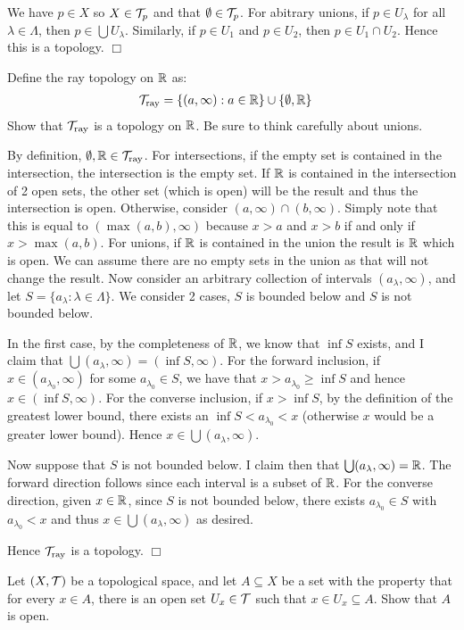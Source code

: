 \documentclass{article}
\begin{document}
\begin{spacedenumerate}
    We have $p\in X$ so $X\in \mathcal{T}_{p}$ and that $\emptyset \in \mathcal{T}_{p}$. For abitrary unions, if $p\in U_{\lambda}$ for all $\lambda \in \Lambda$, then $p\in \bigcup U_{\lambda}$. Similarly, if $p\in U_{1}$ and $p\in U_{2}$, then $p\in U_{1}\cap U_{2}$. Hence this is a topology. $\Box$
    \item Define the ray topology on $\mathbb{R}$ as:
    \begin{align*}
        \mathcal{T}_{\text{ray}} &= \{(a,\infty): a\in \mathbb{R}\}\cup \{\emptyset, \mathbb{R}\}
    \end{align*}
    Show that $\mathcal{T}_{\text{ray}}$ is a topology on $\mathbb{R}$. Be sure to think carefully about unions.

    By definition, $\emptyset, \mathbb{R} \in \mathcal{T}_{\text{ray}}$. For intersections, if the empty set is contained in the intersection, the intersection is the empty set. If $\mathbb{R}$ is contained in the intersection of 2 open sets, the other set (which is open) will be the result and thus the intersection is open. Otherwise, consider $(a,\infty) \cap (b,\infty)$. Simply note that this is equal to $(\max(a,b), \infty)$ because $x > a$ and $x > b$ if and only if $x > \max(a,b)$. For unions, if $\mathbb{R}$ is contained in the union the result is $\mathbb{R}$ which is open. We can assume there are no empty sets in the union as that will not change the result. Now consider an arbitrary collection of intervals $(a_{\lambda}, \infty)$, and let $S = \{a_{\lambda}: \lambda\in \Lambda\}$. We consider 2 cases, $S$ is bounded below and $S$ is not bounded below. 
    
    In the first case, by the completeness of $\mathbb{R}$, we know that $\inf S$ exists, and I claim that $\bigcup (a_{\lambda}, \infty) =  (\inf S, \infty)$. For the forward inclusion, if $x \in (a_{\lambda_{0}}, \infty)$ for some $a_{\lambda_{0}}\in S$, we have that $x >  a_{\lambda_{0}} \geq \inf S$ and hence $x\in (\inf S, \infty)$. For the converse inclusion, if $x > \inf S$, by the definition of the greatest lower bound, there exists an $\inf S < a_{\lambda_{0}} < x$ (otherwise $x$ would be a greater lower bound). Hence $x \in \bigcup (a_{\lambda}, \infty)$. 

    Now suppose that $S$ is not bounded below. I claim then that $\bigcup (a_{\lambda}, \infty) = \mathbb{R}$. The forward direction follows since each interval is a subset of $\mathbb{R}$. For the converse direction, given $x\in \mathbb{R}$, since $S$ is not bounded below, there exists $a_{\lambda_{0}} \in S$ with $a_{\lambda_{0}} < x$ and thus $x\in \bigcup (a_{\lambda}, \infty)$ as desired.

    Hence $\mathcal{T}_{\text{ray}}$ is a topology. $\Box$
    \item Let $(X, \mathcal{T} )$ be a topological space, and let $A \subseteq X$ be a set with the property that for every $x \in  A$, there is an open set $U_{x} \in \mathcal{T}$ such that $x \in U_{x} \subseteq A$. Show that $A$ is open.
    

\end{spacedenumerate}
\end{document}
